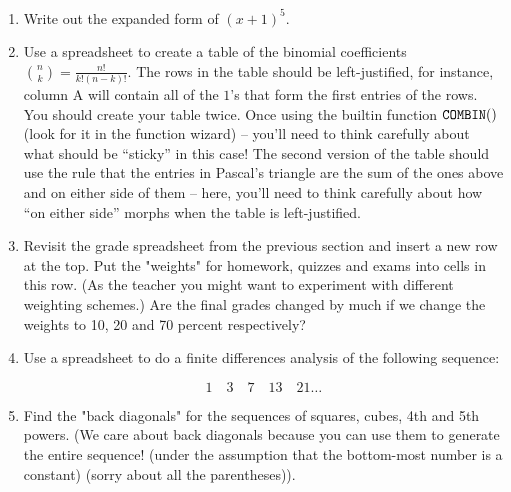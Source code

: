 \begin{enumerate}

\item Write out the expanded form of $(x+1)^5$.

\vspace{1in}

\item Use a spreadsheet to create a table of the binomial coefficients $\binom{n}{k} = \frac{n!}{k!(n-k)!}$.  The rows in the table should be left-justified, for instance, column A will contain all of the $1$'s that form the first entries of the rows.  You should create your table twice.  Once using the builtin function $\tt COMBIN()$ (look for it in the function wizard) -- you'll need to think carefully about what should be ``sticky'' in this case!  The second version of the table should use the rule that the entries in Pascal's triangle are the sum of the ones above and on either side of them -- here, you'll need to think carefully about how ``on either side'' morphs when the table is left-justified.
	

\vspace{1in}

\item Revisit the grade spreadsheet from the previous section and insert a new row at the top.  Put the "weights" for homework, 
quizzes and exams into cells in this row.  (As the teacher you might want to experiment with different 
weighting schemes.) Are the final grades changed by much if we change the weights to 10, 
20 and 70 percent respectively?

\vspace{1 in}

\item Use a spreadsheet to do a finite differences analysis of the following sequence:

	  \[ 1 \quad 3 \quad 7 \quad 13 \quad 21 \ldots \]

\vspace{1in}

\item Find the "back diagonals" for the sequences of squares, cubes, 4th  and 5th powers.
(We care about back diagonals because you can use them to generate the entire sequence! (under the assumption that the bottom-most number is a constant) (sorry about all the parentheses)). 

\vfill

\end{enumerate}

